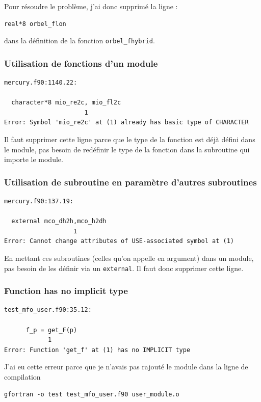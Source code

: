\documentclass[a4paper,twoside]{article}
\begin{document}
Pour résoudre le problème, j'ai donc supprimé la ligne : 
\begin{verbatim}
real*8 orbel_flon
\end{verbatim}
dans la définition de la fonction \verb|orbel_fhybrid|.

\subsubsection{Utilisation de fonctions d'un module}
\begin{verbatim}
mercury.f90:1140.22:

  character*8 mio_re2c, mio_fl2c
                      1
Error: Symbol 'mio_re2c' at (1) already has basic type of CHARACTER
\end{verbatim}
Il faut supprimer cette ligne parce que le type de la fonction est déjà défini dans le module, pas besoin de redéfinir le type de la fonction dans la subroutine qui importe le module.

\subsubsection{Utilisation de subroutine en paramètre d'autres subroutines}
\begin{verbatim}
mercury.f90:137.19:

  external mco_dh2h,mco_h2dh
                   1
Error: Cannot change attributes of USE-associated symbol at (1)
\end{verbatim}

En mettant ces subroutines (celles qu'on appelle en argument) dans un module, pas besoin de les définir via un \texttt{external}. Il faut donc supprimer cette ligne.

\subsubsection{Function has no implicit type}
\begin{verbatim}
test_mfo_user.f90:35.12:

      f_p = get_F(p)
            1
Error: Function 'get_f' at (1) has no IMPLICIT type
\end{verbatim}

J'ai eu cette erreur parce que je n'avais pas rajouté le module dans la ligne de compilation 
\begin{verbatim}
gfortran -o test test_mfo_user.f90 user_module.o
\end{verbatim}
\end{document}
